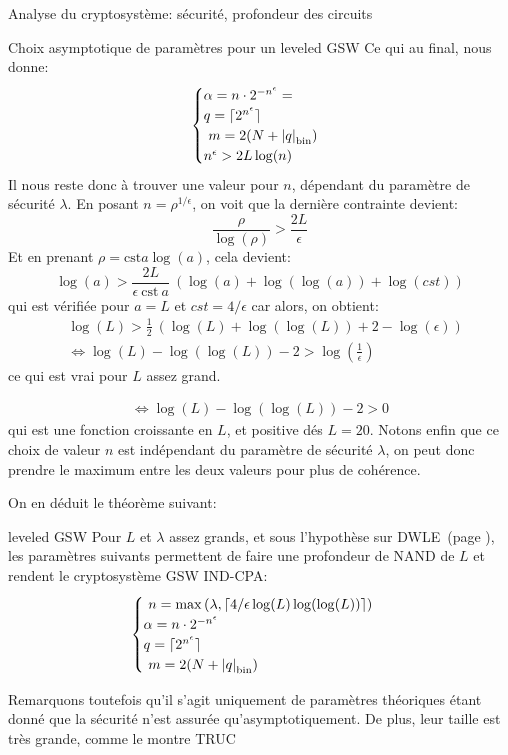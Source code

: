 \begin{section}{Analyse du cryptosystème: sécurité, profondeur des circuits}
\begin{subsection}{Choix asymptotique de paramètres pour un leveled GSW}
Ce qui au final, nous donne:
\[ \begin{cases}
	\alpha  = n \cdot 2^{-n^\epsilon}=  \\
	q = \lceil 2^{n^\epsilon} \rceil\\ 
	m = 2(N + \bnorm{q}) \\  
	n^\epsilon > 2 L \log(n)
	\end{cases}  \]
Il nous reste donc à trouver une valeur pour $n$, dépendant du paramètre de sécurité $\lambda$.  En posant $n = \rho^{1/\epsilon}$, on voit que la dernière contrainte devient:
\[ \frac{\rho}{\log(\rho)} > \frac{2 L}{\epsilon}  \]
Et en prenant $\rho = \text{cst} a \log(a)$, cela devient:
\[\log(a)> \frac{2 L}{\epsilon\:\text{cst}\: a}\:(\log(a) + \log(\log(a)) + \log(cst))   \]
qui est vérifiée pour $a = L$ et $cst = 4/\epsilon$ car alors, on obtient:
\begin{align*}
& \log(L)> \frac{1}{\text{2}}\:(\log(L) + \log(\log(L)) + 2 - \log(\epsilon)) \\
&\Leftrightarrow  \log(L) - \log(\log(L)) - 2 > \log(\frac{1}{\epsilon})
\end{align*}
ce qui est vrai pour $L$ assez grand.  

\begin{align*}
\Leftrightarrow  \log(L) - \log(\log(L)) - 2 > 0
\end{align*}
qui est une fonction croissante en $L$, et positive dés $L = 20$.  Notons enfin que ce choix de valeur $n$ est indépendant du paramètre de sécurité $\lambda$, on peut donc prendre le maximum entre les deux
valeurs pour plus de cohérence.  

On en déduit le théorème suivant:
\begin{thm}{leveled GSW}
Pour $L$ et $\lambda$ assez grands, et sous l'hypothèse sur DWLE~(page \pageref{hyp_dwle}), les paramètres suivants permettent de faire une profondeur de NAND de $L$
et rendent le cryptosystème GSW IND-CPA:
\[ \begin{cases} 
	n = \max\left(\lambda, \lceil 4/\epsilon \log(L) \log(\log(L))
	\rceil\right)  \\
	\alpha  = n \cdot 2^{-n^\epsilon}  \\
	q = \lceil 2^{n^\epsilon} \rceil\\ 
	m = 2(N + \bnorm{q}) \\  
	\end{cases}  \]
\end{thm}
Remarquons toutefois qu'il s'agit uniquement de paramètres \og théoriques \fg
étant donné que la sécurité n'est assurée qu'asymptotiquement. De plus, leur
taille est très grande, comme le montre TRUC





\end{subsection}
\end{section}
